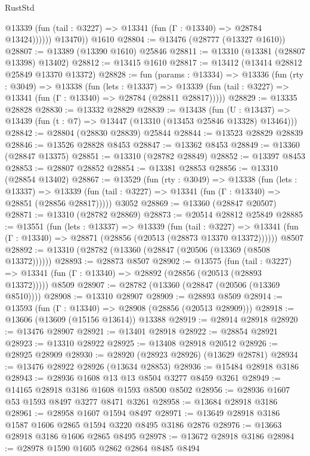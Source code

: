 \begin{lexlean}{RustStd}
\begin{coremodule}
              @13339 (fun (tail : @3227) => @13341 (fun (Γ : @13340) => @28784 @13424))))))
        @13470))
    @1610
@28804 := @13476 (@28777 (@13327 @1610))
@28807 := @13389 (@13390 @1610) @25846
@28811 := @13310 (@13381 (@28807 @13398) @13402)
@28812 := @13415 @1610
@28817 := @13412 (@13414 @28812 @25849 @13370 @13372)
@28828 := fun (params : @13334) =>
  @13336
    (fun (rty : @3049) =>
    @13338
      (fun (lets : @13337) =>
      @13339 (fun (tail : @3227) => @13341 (fun (Γ : @13340) => @28784 (@28811 @28817)))))
@28829 := @13335 @28828
@28830 := @13332 @28829
@28839 := @13438
    (fun (U : @13437) => @13439 (fun (t : @7) => @13447 (@13310 (@13453 @25846 @13328) @13464)))
@28842 := @28804 (@28830 @28839) @25844
@28844 := @13523 @28829 @28839
@28846 := @13526 @28828 @8453
@28847 := @13362 @8453
@28849 := @13360 (@28847 @13375)
@28851 := @13310 (@28782 @28849)
@28852 := @13397 @8453
@28853 := @28807 @28852
@28854 := @13381 @28853
@28856 := @13310 (@28854 @13402)
@28867 := @13529
    (fun (rty : @3049) =>
    @13338
      (fun (lets : @13337) =>
      @13339 (fun (tail : @3227) => @13341 (fun (Γ : @13340) => @28851 (@28856 @28817)))))
    @3052
@28869 := @13360 (@28847 @20507)
@28871 := @13310 (@28782 @28869)
@28873 := @20514 @28812 @25849
@28885 := @13551
    (fun (lets : @13337) =>
    @13339
      (fun (tail : @3227) =>
      @13341 (fun (Γ : @13340) => @28871 (@28856 (@20513 (@28873 @13370 @13372))))))
    @8507
@28892 := @13310 (@28782 (@13360 (@28847 (@20506 (@13369 (@8508 @13372))))))
@28893 := @28873 @8507
@28902 := @13575
    (fun (tail : @3227) => @13341 (fun (Γ : @13340) => @28892 (@28856 (@20513 (@28893 @13372)))))
    @8509
@28907 := @28782 (@13360 (@28847 (@20506 (@13369 @8510))))
@28908 := @13310 @28907
@28909 := @28893 @8509
@28914 := @13593 (fun (Γ : @13340) => @28908 (@28856 (@20513 @28909)))
@28918 := @13606 (@13609 (@15156 @13614)) @13388
@28919 := @28914 @28918
@28920 := @13476 @28907
@28921 := @13401 @28918
@28922 := @28854 @28921
@28923 := @13310 @28922
@28925 := @13408 @28918 @20512
@28926 := @28925 @28909
@28930 := @28920 (@28923 @28926) (@13629 @28781)
@28934 := @13476 @28922 @28926 (@13634 @28853)
@28936 := @15484 @28918 @3186
@28943 := @28936 @1608 @13 @13 @8504 @3277 @8459 @3261
@28949 := @14165 @28918 @3186 @1608 @1593 @8500 @8502
@28956 := @28936 @1607 @53 @1593 @8497 @3277 @8471 @3261
@28958 := @13684 @28918 @3186
@28961 := @28958 @1607 @1594 @8497
@28971 := @13649 @28918 @3186 @1587 @1606 @2865 @1594 @3220 @8495 @3186 @2876
@28976 := @13663 @28918 @3186 @1606 @2865 @8495
@28978 := @13672 @28918 @3186
@28984 := @28978 @1590 @1605 @2862 @2864 @8485 @8494

\end{coremodule}
\end{lexlean}
